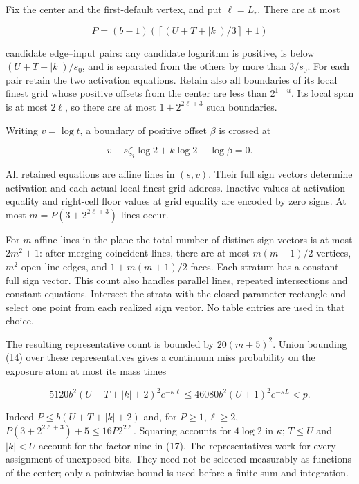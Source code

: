 \documentclass[
  11pt,
]{article}
\begin{document}
Fix the center and the first-default vertex, and put \(\ell =L_r\).
There are at most

\[
 P=(b-1)\left(\left\lceil (U+T+|k|)/3\right\rceil+1\right) \tag{15}
\]

candidate edge--input pairs: any candidate logarithm is positive, is
below \((U+T+|k|)/s_0\), and is separated from the others by more than
\(3/s_0\). For each pair retain the two activation equations. Retain
also all boundaries of its local finest grid whose positive offsets from
the center are less than \(2^{1-u}\). Its local span is at most
\(2\ell\), so there are at most \(1+2^{2\ell +3}\) such boundaries.

Writing \(v=\log  t\), a boundary of positive offset \(\beta\) is
crossed at

\[
 v-s\zeta_i\log2+k\log2-\log\beta=0.                     \tag{16}
\]

All retained equations are affine lines in \((s,v)\). Their full sign
vectors determine activation and each actual local finest-grid address.
Inactive values at activation equality and right-cell floor values at
grid equality are encoded by zero signs. At most \(m=P(3+2^{2\ell +3})\)
lines occur.

For \(m\) affine lines in the plane the total number of distinct sign
vectors is at most \(2m^2+1\): after merging coincident lines, there are
at most \(m(m-1)/2\) vertices, \(m^2\) open line edges, and
\(1+m(m+1)/2\) faces. Each stratum has a constant full sign vector. This
count also handles parallel lines, repeated intersections and constant
equations. Intersect the strata with the closed parameter rectangle and
select one point from each realized sign vector. No table entries are
used in that choice.

The resulting representative count is bounded by \(20(m+5)^2\). Union
bounding (14) over these representatives gives a continuum miss
probability on the exposure atom at most its mass times

\[
 5120b^2(U+T+|k|+2)^2e^{-\kappa\ell}
 \le46080b^2(U+1)^2e^{-\kappa L}<p.                       \tag{17}
\]

Indeed \(P\le b(U+T+|k|+2)\) and, for \(P\ge 1,\ell \ge 2\),
\(P(3+2^{2\ell +3})+5\le 16P2^{2\ell }\). Squaring accounts for
\(4\log 2\) in \(\kappa\); \(T\le U\) and \(|k|<U\) account for the
factor nine in (17). The representatives work for every assignment of
unexposed bits. They need not be selected measurably as functions of the
center; only a pointwise bound is used before a finite sum and
integration.
\end{document}
